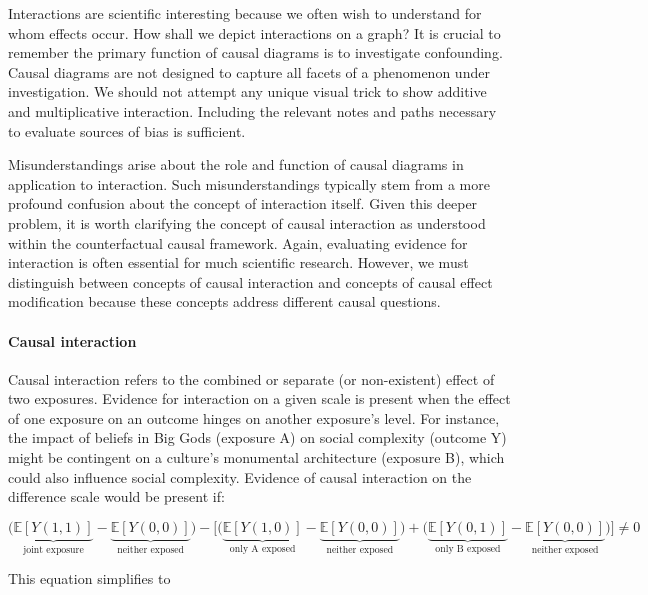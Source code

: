 \documentclass[
  singlecolumn]{article}
\let\oldparagraph\paragraph
\renewcommand{\paragraph}[1]{\oldparagraph{#1}\mbox{}}
\begin{document}
Interactions are scientific interesting because we often wish to
understand for whom effects occur. How shall we depict interactions on a
graph? It is crucial to remember the primary function of causal diagrams
is to investigate confounding. Causal diagrams are not designed to
capture all facets of a phenomenon under investigation. We should not
attempt any unique visual trick to show additive and multiplicative
interaction. Including the relevant notes and paths necessary to
evaluate sources of bias is sufficient.

Misunderstandings arise about the role and function of causal diagrams
in application to interaction. Such misunderstandings typically stem
from a more profound confusion about the concept of interaction itself.
Given this deeper problem, it is worth clarifying the concept of causal
interaction as understood within the counterfactual causal framework.
Again, evaluating evidence for interaction is often essential for much
scientific research. However, we must distinguish between concepts of
causal interaction and concepts of causal effect modification because
these concepts address different causal questions.

\hypertarget{causal-interaction}{%
\paragraph{\texorpdfstring{\textbf{Causal
interaction}}{Causal interaction}}\label{causal-interaction}}

Causal interaction refers to the combined or separate (or non-existent)
effect of two exposures. Evidence for interaction on a given scale is
present when the effect of one exposure on an outcome hinges on another
exposure's level. For instance, the impact of beliefs in Big Gods
(exposure A) on social complexity (outcome Y) might be contingent on a
culture's monumental architecture (exposure B), which could also
influence social complexity. Evidence of causal interaction on the
difference scale would be present if:

\[\bigg(\underbrace{\mathbb{E}[Y(1,1)]}_{\text{joint exposure}} - \underbrace{\mathbb{E}[Y(0,0)]}_{\text{neither exposed}}\bigg) - \bigg[ \bigg(\underbrace{\mathbb{E}[Y(1,0)]}_{\text{only A exposed}} - \underbrace{\mathbb{E}[Y(0,0)]}_{\text{neither exposed}}\bigg) + \bigg(\underbrace{\mathbb{E}[Y(0,1)]}_{\text{only B exposed}} - \underbrace{\mathbb{E}[Y(0,0)]}_{\text{neither exposed}} \bigg)\bigg] \neq 0 \]

This equation simplifies to
\end{document}
